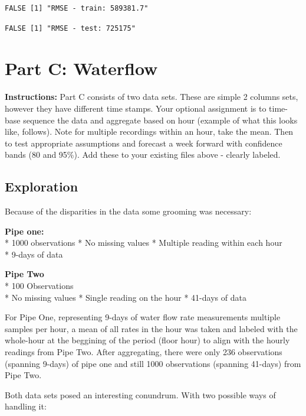 \documentclass[openany]{book}
\renewenvironment{quote}{\begin{myquote}}{\end{myquote}}
\begin{document}
\begin{verbatim}
FALSE [1] "RMSE - train: 589381.7"
\end{verbatim}

\begin{verbatim}
FALSE [1] "RMSE - test: 725175"
\end{verbatim}

\hypertarget{part-c-waterflow}{%
\chapter{Part C: Waterflow}\label{part-c-waterflow}}

\begin{quote}
\textbf{Instructions:} Part C consists of two data sets. These are
simple 2 columns sets, however they have different time stamps. Your
optional assignment is to time-base sequence the data and aggregate
based on hour (example of what this looks like, follows). Note for
multiple recordings within an hour, take the mean. Then to test
appropriate assumptions and forecast a week forward with confidence
bands (80 and 95\%). Add these to your existing files above - clearly
labeled.
\end{quote}

\hypertarget{exploration-2}{%
\section{Exploration}\label{exploration-2}}

Because of the disparities in the data some grooming was necessary:

\textbf{Pipe one:}\\
* 1000 observations * No missing values * Multiple reading within each
hour\\
* 9-days of data

\textbf{Pipe Two}\\
* 100 Observations\\
* No missing values * Single reading on the hour * 41-days of data

For Pipe One, representing 9-days of water flow rate measurements
multiple samples per hour, a mean of all rates in the hour was taken and
labeled with the whole-hour at the beggining of the period (floor hour)
to align with the hourly readings from Pipe Two. After aggregating,
there were only 236 observations (spanning 9-days) of pipe one and still
1000 observations (spanning 41-days) from Pipe Two.

Both data sets posed an interesting conundrum. With two possible ways of
handling it:
\end{document}
